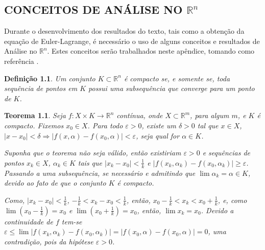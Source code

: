 \documentclass[
	12pt,				%
	openright,			%
    twoside,			%
	a4paper,			%
	chapter=TITLE,		%
	english,			%
	french,				%
	spanish,			%
	brazil				%
	]{abntex2}
\makeatletter
\newtheorem{teorema}{Teorema}
\newtheorem{definicao}{Definição}
\renewenvironment{proof}[1][\proofname]{
	\par\pushQED{\qed}%
	\normalfont \topsep6\p@\@plus6\p@\relax
	\trivlist
	\item\relax
		{\itshape
			#1\@addpunct{.}}\hspace\labelsep\ignorespaces
}{%
	\popQED\endtrivlist\@endpefalse
}
\numberwithin{lema}{chapter}
\numberwithin{teorema}{chapter}
\numberwithin{definicao}{chapter}
\numberwithin{exemplo}{chapter}
\numberwithin{figure}{chapter}
\makeatother
\begin{document}
\begin{apendicesenv}

\partapendices

\chapter{CONCEITOS DE ANÁLISE NO $\mathbb{R}^n$}
\label{apend:regra_de_leibniz}
{
	Durante o desenvolvimento dos resultados do texto, tais como a obtenção da equação de Euler-Lagrange, é necessário o uso de alguns conceitos e resultados de Análise no $\mathbb{R}^n$. Estes conceitos serão trabalhados neste apêndice, tomando como referência .

	\begin{definicao}
		Um conjunto $K\subset \mathbb{R}^n$ é compacto se, e somente se, toda sequência de pontos em $K$ possui uma subsequência que converge para um ponto de $K$.
	\end{definicao}

	\begin{teorema}
		\label{teorema:func_uniformemente}
		Seja $f:X\times K \longrightarrow \mathbb{R}^n$ contínua, onde $X\subset \mathbb{R}^m$, para algum $m$, e $K$ é compacto. Fixemos $x_0 \in X$. Para todo $\varepsilon > 0$, existe um $\delta > 0$ tal que $x\in X$, $|x-x_0|<\delta \Longrightarrow |f(x, \alpha)-f(x_0,\alpha)|<\varepsilon$, seja qual for $\alpha \in K$.
		\begin{proof}
		Suponha que o teorema não seja válido, então existiriam $\varepsilon > 0$ e sequências de pontos $x_k\in X$, $\alpha_k \in K$ tais que $|x_k-x_0|<\frac{1}{k}$ e $|f(x_k,\alpha_k)-f(x_0,\alpha_k)|\geqslant \varepsilon$. Passando a uma subsequência, se necessário e admitindo que $\lim \alpha_k=\alpha \in K$, devido ao fato de que o conjunto $K$ é compacto.
		
		Como, $|x_k-x_0|<\frac{1}{k}$, $-\frac{1}{k}<x_k-x_0<\frac{1}{k}$, então, $x_0-\frac{1}{k}<x_k<x_0+\frac{1}{k}$, e, como $\lim \left (x_0-\frac{1}{k} \right ) = x_0$ e $\lim \left ( x_0 + \frac{1}{k} \right )=x_0$, então, $\lim x_k=x_0$. Devido a continuidade de $f$ tem-se $\varepsilon \leqslant \lim |f(x_k,\alpha_k)-f(x_0,\alpha _k)|=|f(x_0,\alpha)-f(x_0,\alpha)|=0$, uma contradição, pois da hipótese $\varepsilon >0$.
		\end{proof}
	\end{teorema}
	
}
\end{apendicesenv}
\end{document}
